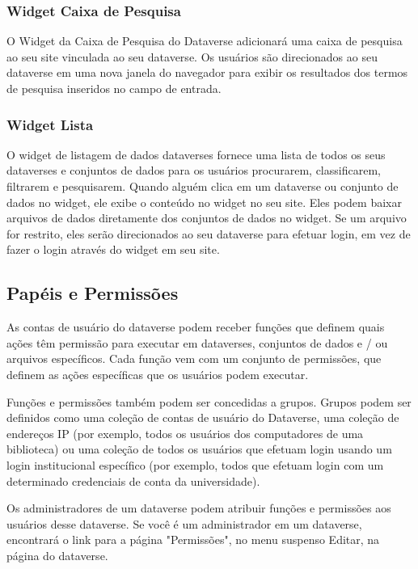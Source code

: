 \documentclass[12pt,hidelinks]{article}
\begin{document}
        \subsubsection{Widget Caixa de Pesquisa}
    
\qquad O Widget da Caixa de Pesquisa do Dataverse adicionará uma caixa de pesquisa ao seu site vinculada ao seu dataverse. Os usuários são direcionados ao seu dataverse em uma nova janela do navegador para exibir os resultados dos termos de pesquisa inseridos no campo de entrada.
    
        \subsubsection{Widget Lista}

\qquad O widget de listagem de dados dataverses fornece uma lista de todos os seus dataverses e conjuntos de dados para os usuários procurarem, classificarem, filtrarem e pesquisarem. Quando alguém clica em um dataverse ou conjunto de dados no widget, ele exibe o conteúdo no widget no seu site. Eles podem baixar arquivos de dados diretamente dos conjuntos de dados no widget. Se um arquivo for restrito, eles serão direcionados ao seu dataverse para efetuar login, em vez de fazer o login através do widget em seu site.
    
    \subsection{Papéis e Permissões}
    
\qquad As contas de usuário do dataverse podem receber funções que definem quais ações têm permissão para executar em dataverses, conjuntos de dados e / ou arquivos específicos. Cada função vem com um conjunto de permissões, que definem as ações específicas que os usuários podem executar.

Funções e permissões também podem ser concedidas a grupos. Grupos podem ser definidos como uma coleção de contas de usuário do Dataverse, uma coleção de endereços IP (por exemplo, todos os usuários dos computadores de uma biblioteca) ou uma coleção de todos os usuários que efetuam login usando um login institucional específico (por exemplo, todos que efetuam login com um determinado credenciais de conta da universidade).

Os administradores de um dataverse podem atribuir funções e permissões aos usuários desse dataverse. Se você é um administrador em um dataverse, encontrará o link para a página "Permissões", no menu suspenso Editar, na página do dataverse.
\end{document}
